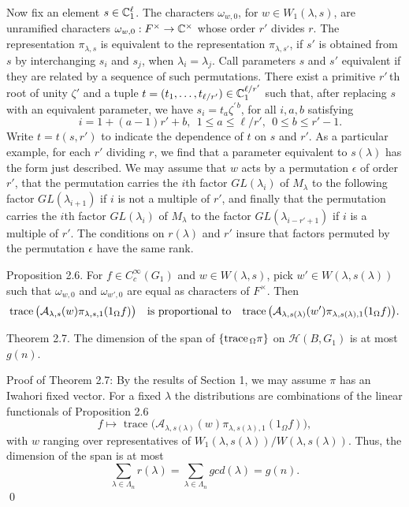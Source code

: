 \documentclass{amsart}
\begin{document}
Now fix an element
  $s \in {\Bbb C}^\ell_1$.
The characters 
  $ \omega_{w,0} $, for
  $w \in W_1(\lambda,s) $,
are unramified characters
  $ \omega_{w,0}: F^{\times} \to {\Bbb C}^{\times} $
whose order $r'$ divides $r$.
The representation $\pi_{\lambda,s}$ is equivalent to the representation
$\pi_{\lambda,s'}$, if $s'$ is obtained from $s$ by interchanging
$s_i$ and $s_j$, when $\lambda_i=\lambda_j$.  Call parameters $s$ and $s'$
equivalent if they are related by a sequence of such permutations.
There exist a primitive $r'$\,th root of unity $\zeta'$ and a
tuple $t=(t_1,\ldots,t_{\ell/r'})\in {\Bbb C}^{\ell/r'}_1$ such that, after
replacing $s$ with an equivalent parameter, we have
$s_i = t_a\zeta^{\prime\,b}$, for all  $i,a,b$  satisfying 
	$$\quad i = 1+(a-1)r'+b,\ \ 1\le a\le \ell/r',\ \  0\le b\le r'-1.$$
Write $t = t(s,r')$ to indicate the dependence of $t$ on $s$ and $r'$.  As a particular
example, for each $r'$ dividing $r$, we find that a parameter equivalent to $s(\lambda)$ has the
form just described.
We may assume that $w$ acts by a permutation $\epsilon$ of order $r'$,
that the permutation carries the $i$th factor $GL(\lambda_i)$ of $M_\lambda$
to the following factor $GL(\lambda_{i+1})$ if $i$ is not a multiple of $r'$, and finally
that the permutation carries the $i$th factor $GL(\lambda_i)$ of $M_\lambda$
to the factor $GL(\lambda_{i-r'+1})$ if $i$ is a multiple of $r'$.
The conditions on $r(\lambda)$ and $r'$ insure that factors permuted by the
permutation $\epsilon$ have the same rank.

\proclaim Proposition {2.6}.
For
  $ f \in C_c^{\infty} (G_1) $ and
  $ w \in W (\lambda,s) $,
pick 
  $ w' \in W (\lambda,s(\lambda)) $
such that
  $ \omega_{w,0}$ and $\omega_{w',0} $
  are equal
as characters of 
  $F^{\times} $.
Then
%
$$
  \text{{\rm trace}} \, 
    \bigl(
      {\mathcal A}_{\lambda,s} (w)
      \pi_{\lambda,s,1} 
      ( 1_{\Omega} f)
    \bigr) 
    \quad
    \text{is proportional to}\quad
  \text{{\rm trace}} \, 
    \bigl(
      {\mathcal A}_{\lambda,s(\lambda)} (w')
      \pi_{\lambda,s(\lambda),1} 
      ( 1_{\Omega} f)
    \bigr). 
$$
%
\finishproclaim

\proclaim Theorem {2.7}.
The dimension of the span of
  $ \{ \text{{\rm trace}}_{\, \Omega} \pi \} $
on
  $ {\mathcal H} (B, G_1) $
is at most
  $ g(n) $.
\finishproclaim

\pproclaim Proof of Theorem 2.7:
By the results of Section 1, we may assume
  $ \pi $
has an Iwahori fixed vector. 
For a fixed 
  $ \lambda $
the distributions are combinations of
the linear functionals of Proposition 2.6
%
$$
  f \mapsto \text{ trace }
  \bigl(
    {\mathcal A}_{\lambda,s(\lambda)} (w)
    \pi_{\lambda,s(\lambda),1} (1_{\Omega} f)
  \bigr),
$$
%
with
  $ w $
ranging over representatives of 
  $ W_1 (\lambda,s(\lambda)) /
    W   (\lambda,s(\lambda)) $.
Thus, the dimension of the span is at most
%
$$
  \sum_{\lambda \in \Lambda_n}
  r (\lambda) =
  \sum_{\lambda \in \Lambda_n}
  gcd (\lambda) = g(n).
$$
%
\qed
\finishpproclaim
\end{document}
